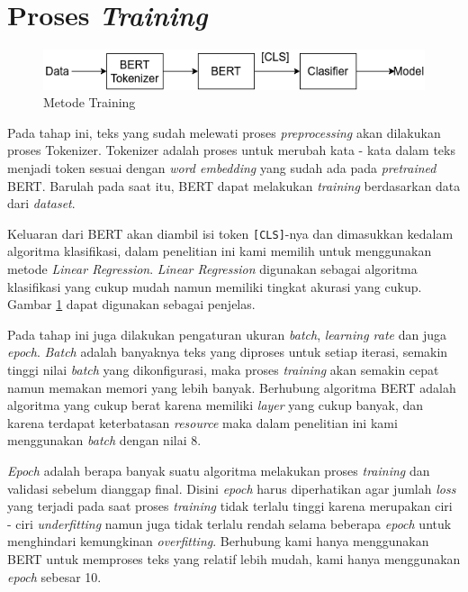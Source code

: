 \section {Proses \textit{Training}}

\begin{figure}[h!]
  \begin{center}
    \includegraphics[width= 0.9\linewidth]{gambar/training.png}
    \caption{Metode Training}
    \label{fig: metodologi_training}
  \end{center}
\end{figure}

Pada tahap ini, teks yang sudah melewati proses \textit{preprocessing} akan dilakukan proses Tokenizer. Tokenizer adalah proses untuk merubah kata - kata dalam teks menjadi token sesuai dengan \textit{word embedding} yang sudah ada pada \textit{pretrained} BERT. Barulah pada saat itu, BERT dapat melakukan \textit{training} berdasarkan data dari \textit{dataset}.

Keluaran dari BERT akan diambil isi token \texttt{[CLS]}-nya dan dimasukkan kedalam algoritma klasifikasi, dalam penelitian ini kami memilih untuk menggunakan metode \textit{Linear Regression}. \textit{Linear Regression} digunakan sebagai algoritma klasifikasi yang cukup mudah namun memiliki tingkat akurasi yang cukup. Gambar \ref{fig: metodologi_training} dapat digunakan sebagai penjelas.

Pada tahap ini juga dilakukan pengaturan ukuran \textit{batch}, \textit{learning rate} dan juga \textit{epoch}. \textit{Batch} adalah banyaknya teks yang diproses untuk setiap iterasi, semakin tinggi nilai \textit{batch} yang dikonfigurasi, maka proses \textit{training} akan semakin cepat namun memakan memori yang lebih banyak. Berhubung algoritma BERT adalah algoritma yang cukup berat karena memiliki \textit{layer} yang cukup banyak, dan karena terdapat keterbatasan \textit{resource} maka dalam penelitian ini kami menggunakan \textit{batch} dengan nilai 8.

\textit{Epoch} adalah berapa banyak suatu algoritma melakukan proses \textit{training} dan validasi sebelum dianggap final. Disini \textit{epoch} harus diperhatikan agar jumlah \textit{loss} yang terjadi pada saat proses \textit{training} tidak terlalu tinggi karena merupakan ciri - ciri \textit{underfitting} namun juga tidak terlalu rendah selama beberapa \textit{epoch} untuk menghindari kemungkinan \textit{overfitting}. Berhubung kami hanya menggunakan BERT untuk memproses teks yang relatif lebih mudah, kami hanya menggunakan \textit{epoch} sebesar 10.


